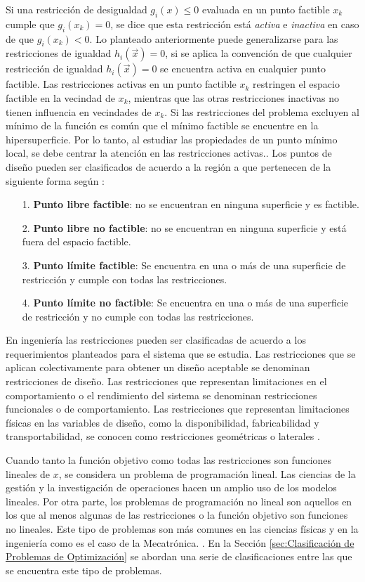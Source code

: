 Si una restricción de desigualdad $g_i(x) \leq 0$ evaluada en un punto factible $x_k$ cumple que $g_i(x_k)=0$, se dice que esta restricción está \textit{activa}  e \textit{inactiva} en caso de que $g_i(x_k) < 0$. Lo planteado anteriormente puede generalizarse  para las restricciones de igualdad $h_i(\vec{x})=0$, si se aplica la convención de que cualquier restricción de igualdad $h_i(\vec{x})=0$ se encuentra activa en cualquier punto factible. Las restricciones activas en un punto factible $x_k$ restringen el espacio factible en la vecindad de $x_k$, mientras que las otras restricciones inactivas no tienen influencia en vecindades de $x_k$. Si las restricciones del problema excluyen al mínimo de la función es común que el mínimo factible se encuentre en la hipersuperficie. Por lo tanto, al estudiar las propiedades de un punto mínimo local, se debe centrar la  atención en las restricciones activas.\cite{luenberger_linear_2015}. Los puntos de diseño pueden ser clasificados de acuerdo a la región a que pertenecen de la siguiente forma según \cite{rao_engineering_2009}:
\begin{itemize}
\item[1.] \textbf{Punto libre factible}: no se encuentran en ninguna superficie y es factible.
\item[2.] \textbf{Punto libre no factible}:  no se encuentran en ninguna superficie y está fuera del espacio factible.
\item[3.] \textbf{Punto límite factible}:  Se encuentra en una o más de una superficie de restricción y cumple con todas las restricciones.
\item[4.] \textbf{Punto límite no factible}: Se encuentra en una o más de una superficie de restricción y no cumple con todas las restricciones.
 \end{itemize}

En ingeniería las restricciones pueden ser clasificadas de acuerdo a los requerimientos planteados para el sistema que se estudia. Las restricciones que se aplican colectivamente para obtener un diseño aceptable se denominan restricciones de diseño. Las restricciones que representan limitaciones en el comportamiento o el rendimiento del sistema se denominan restricciones funcionales o de comportamiento. Las restricciones que representan limitaciones físicas en las variables de diseño, como la disponibilidad, fabricabilidad y transportabilidad, se conocen como restricciones geométricas o laterales  \cite{rao_engineering_2009}.

Cuando tanto la función objetivo como todas las restricciones son funciones lineales de $x$, se considera un problema de programación lineal. Las ciencias de la gestión y la investigación de operaciones hacen un amplio uso de los modelos lineales. Por otra parte, los problemas de programación no lineal son aquellos en los que al menos algunas de las restricciones o la función objetivo son funciones no lineales. Este tipo de problemas son más comunes en las ciencias físicas y en la ingeniería como es el caso de la Mecatrónica. \cite{nocedal2006numerical}. En la Sección \ref{sec:Clasificación de Problemas de Optimización} se abordan una serie de clasificaciones entre las que se encuentra este tipo de problemas. 
